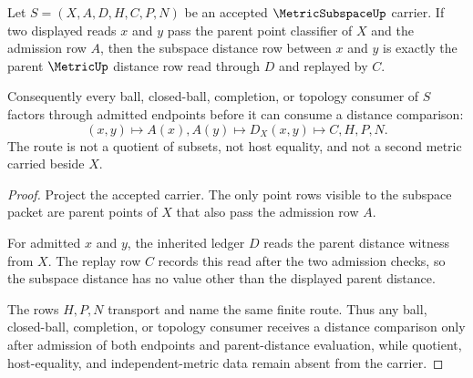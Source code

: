 \begin{theorem}
\label{thm:metric-subspace-distance-restriction}
Let $S=(X,A,D,H,C,P,N)$ be an accepted $\MetricSubspaceUp$ carrier. If two displayed reads $x$ and $y$ pass the parent point classifier of $X$ and the admission row $A$, then the subspace distance row between $x$ and $y$ is exactly the parent $\MetricUp$ distance row read through $D$ and replayed by $C$.

Consequently every ball, closed-ball, completion, or topology consumer of $S$ factors through admitted endpoints before it can consume a distance comparison:
$$
(x,y)\longmapsto A(x),A(y)\longmapsto D_X(x,y)\longmapsto C,H,P,N .
$$
The route is not a quotient of subsets, not host equality, and not a second metric carried beside $X$.
\end{theorem}
\begin{proof}
Project the accepted carrier. The only point rows visible to the subspace packet are parent points of $X$ that also pass the admission row $A$.

For admitted $x$ and $y$, the inherited ledger $D$ reads the parent distance witness from $X$. The replay row $C$ records this read after the two admission checks, so the subspace distance has no value other than the displayed parent distance.

The rows $H,P,N$ transport and name the same finite route. Thus any ball, closed-ball, completion, or topology consumer receives a distance comparison only after admission of both endpoints and parent-distance evaluation, while quotient, host-equality, and independent-metric data remain absent from the carrier.
\end{proof}

